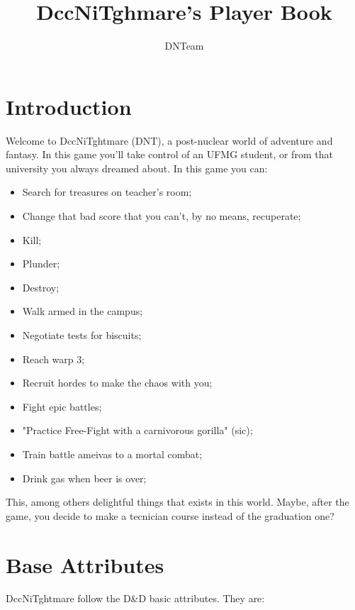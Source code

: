 \documentclass[ letterpaper,12pt]{article}
\begin{document}
\title{\textbf{DccNiTghmare's Player Book}}

\author{
DNTeam
}

\maketitle
{}

\newpage

\tableofcontents

\newpage
\section{Introduction}

Welcome to DccNiTghtmare (DNT), a post-nuclear world of adventure and fantasy.
In this game you'll take control of an UFMG student, or from that university
you always dreamed about. In this game you can:

\begin{itemize}
\item{Search for treasures on teacher's room;}
\item{Change that bad score that you can't, by no means, recuperate;}
\item{Kill;}
\item{Plunder;}
\item{Destroy;}
\item{Walk armed in the campus;}
\item{Negotiate tests for biscuits;}
\item{Reach warp 3;}
\item{Recruit hordes to make the chaos with you;}
\item{Fight epic battles;}
\item{"Practice Free-Fight with a carnivorous gorilla" (sic);}
\item{Train battle ameivas to a mortal combat;}
\item{Drink gas when beer is over;}
\end{itemize}

This, among others delightful things that exists in this world. Maybe, after the game, you decide to make a tecnician course instead of the graduation one?

\section{Base Attributes}
DccNiTghtmare follow the D\&D basic attributes. They are:
\end{document}

